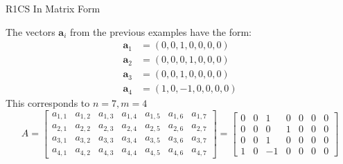 \documentclass{zkdl-presentation-template}
\begin{document}
    \begin{frame}{R1CS In Matrix Form}
        \begin{example}
            The vectors $\mathbf{a}_i$ from the previous examples have the form:
            {\small\begin{align*}
                \mathbf{a}_1 &= (0, 0, 1, 0, 0, 0, 0) \\
                \mathbf{a}_2 &= (0, 0, 0, 1, 0, 0, 0) \\
                \mathbf{a}_3 &= (0, 0, 1, 0, 0, 0, 0) \\
                \mathbf{a}_4 &= (1, 0, -1, 0, 0, 0, 0)
            \end{align*}}
            This corresponds to $n = 7, m = 4$
            {\small \begin{equation*}
                A = \begin{bmatrix}
                    a_{1,1} & a_{1,2} & a_{1,3} & a_{1,4} & a_{1,5} & a_{1,6} & a_{1,7} \\
                    a_{2,1} & a_{2,2} & a_{2,3} & a_{2,4} & a_{2,5} & a_{2,6} & a_{2,7} \\
                    a_{3,1} & a_{3,2} & a_{3,3} & a_{3,4} & a_{3,5} & a_{3,6} & a_{3,7} \\
                    a_{4,1} & a_{4,2} & a_{4,3} & a_{4,4} & a_{4,5} & a_{4,6} & a_{4,7}
                \end{bmatrix} = \begin{bmatrix}
                    0 & 0 & 1 & 0 & 0 & 0 & 0 \\
                    0 & 0 & 0 & 1 & 0 & 0 & 0 \\
                    0 & 0 & 1 & 0 & 0 & 0 & 0 \\
                    1 & 0 & -1 & 0 & 0 & 0 & 0 
                \end{bmatrix}
            \end{equation*}}
        \end{example}
    \end{frame}
\end{document}
